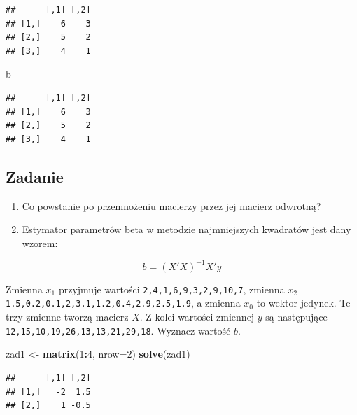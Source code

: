 \documentclass[]{book}
\newenvironment{Shaded}{\begin{snugshade}}{\end{snugshade}}
\newcommand{\KeywordTok}[1]{\textcolor[rgb]{0.13,0.29,0.53}{\textbf{#1}}}
\newcommand{\DataTypeTok}[1]{\textcolor[rgb]{0.13,0.29,0.53}{#1}}
\newcommand{\DecValTok}[1]{\textcolor[rgb]{0.00,0.00,0.81}{#1}}
\newcommand{\StringTok}[1]{\textcolor[rgb]{0.31,0.60,0.02}{#1}}
\newcommand{\OperatorTok}[1]{\textcolor[rgb]{0.81,0.36,0.00}{\textbf{#1}}}
\newcommand{\NormalTok}[1]{#1}
\providecommand{\tightlist}{%
  \setlength{\itemsep}{0pt}\setlength{\parskip}{0pt}}
\begin{document}
\begin{verbatim}
##      [,1] [,2]
## [1,]    6    3
## [2,]    5    2
## [3,]    4    1
\end{verbatim}

\begin{Shaded}
\begin{Highlighting}[]
\NormalTok{b}
\end{Highlighting}
\end{Shaded}

\begin{verbatim}
##      [,1] [,2]
## [1,]    6    3
## [2,]    5    2
## [3,]    4    1
\end{verbatim}

\subsection{Zadanie}\label{zadanie}

\begin{enumerate}
\def\labelenumi{\arabic{enumi}.}
\tightlist
\item
  Co powstanie po przemnożeniu macierzy przez jej macierz odwrotną?
\item
  Estymator parametrów beta w metodzie najmniejszych kwadratów jest dany
  wzorem:
\end{enumerate}

\[b=(X'X)^{-1}X'y\]

Zmienna \(x_1\) przyjmuje wartości \texttt{2,4,1,6,9,3,2,9,10,7},
zmienna \(x_2\) \texttt{1.5,0.2,0.1,2,3.1,1.2,0.4,2.9,2.5,1.9}, a
zmienna \(x_0\) to wektor jedynek. Te trzy zmienne tworzą macierz \(X\).
Z kolei wartości zmiennej \(y\) są następujące
\texttt{12,15,10,19,26,13,13,21,29,18}. Wyznacz wartość \(b\).

\begin{Shaded}
\begin{Highlighting}[]
\NormalTok{zad1 <-}\StringTok{ }\KeywordTok{matrix}\NormalTok{(}\DecValTok{1}\OperatorTok{:}\DecValTok{4}\NormalTok{, }\DataTypeTok{nrow=}\DecValTok{2}\NormalTok{)}
\KeywordTok{solve}\NormalTok{(zad1)}
\end{Highlighting}
\end{Shaded}

\begin{verbatim}
##      [,1] [,2]
## [1,]   -2  1.5
## [2,]    1 -0.5
\end{verbatim}

\begin{Shaded}
\end{Shaded}
\end{document}
